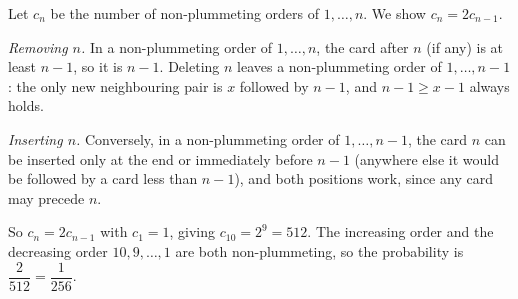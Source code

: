 Let $c_n$ be the number of non-plummeting orders of $1,\dots,n$. We show $c_n=2c_{n-1}$.

\emph{Removing $n$.} In a non-plummeting order of $1,\dots,n$, the card after $n$ (if any) is at least $n-1$, so it is $n-1$. Deleting $n$ leaves a non-plummeting order of $1,\dots,n-1$: the only new neighbouring pair is $x$ followed by $n-1$, and $n-1\ge x-1$ always holds.

\emph{Inserting $n$.} Conversely, in a non-plummeting order of $1,\dots,n-1$, the card $n$ can be inserted only at the end or immediately before $n-1$ (anywhere else it would be followed by a card less than $n-1$), and both positions work, since any card may precede $n$.

So $c_n=2c_{n-1}$ with $c_1=1$, giving $c_{10}=2^9=512$. The increasing order and the decreasing order $10,9,\dots,1$ are both non-plummeting, so the probability is $\dfrac{2}{512}=\boxed{\dfrac1{256}}$.
